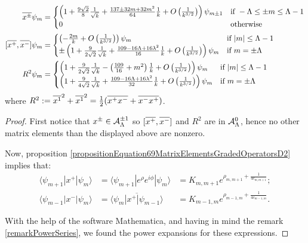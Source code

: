 \begin{proposition}
\begin{align}
    \cut{x^\pm}  \psi_m
        &= \begin{cases}
        \left(1 + \frac{9 \sqrt{2}}{8} \frac{1}{\sqrt{k}} + \frac{137 \pm 32m + 32m^2}{64} \frac{1}{k} + O\left(\frac{1}{k^{3/2}}\right) \right) \psi_{m \pm 1} & \text{if } -\Lambda \leq \pm m \leq \Lambda -1
        \\
        0 & \text{otherwise}
        \end{cases}\\
    [\cut{x^+}, \cut{x^-}]  \psi_m
        &= \begin{cases}
        \left( -\frac{2m}{k}  + O\left(\frac{1}{k^{3/2}}\right) \right) \psi_{m} & \text{if } |m| \leq \Lambda -1
        \\
        \pm \left( 1 + \frac{9}{2\sqrt{2}} \frac{1}{\sqrt{k}} +  \frac{109-16\Lambda + 16\lambda^2}{16} \frac{1}{k} + O\left(\frac{1}{k^{3/2}}\right) \right) \psi_{m} & \text{if } m = \pm \Lambda 
        \end{cases}\\
    R^2  \psi_m
        &= \begin{cases}
        \left( 1+ \frac{9}{2\sqrt{2}} \frac{1}{\sqrt{k}} -\left(\frac{109}{16}+m^2\right) \frac{1}{k}  + O\left(\frac{1}{k^{3/2}}\right) \right) \psi_{m} & \text{if } |m| \leq \Lambda -1
        \\
        \left( 1+ \frac{9}{4\sqrt{2}} \frac{1}{\sqrt{k}} + \frac{109-16\Lambda+16\lambda^2}{32} \frac{1}{k} + O\left(\frac{1}{k^{3/2}}\right) \right) \psi_{m} & \text{if } m = \pm \Lambda 
        \end{cases}
\end{align}
where $R^2 := \overline{x^1}^2 + \overline{x^1}^2 = \frac{1}{2}(\overline{x^+}\overline{x^-} + \overline{x^-}\overline{x^+})$.
\end{proposition}
\begin{proof}
First notice that $x^\pm \in \mathcal A^{\pm 1}_\Lambda$ so $[\overline{x^+}, \overline{x^-}]$ and $R^2$ are in $\mathcal A^0_\Lambda$, hence no other matrix elements than the displayed above are nonzero. 

Now, proposition \ref{propositionEquation69MatrixElementsGradedOperatorsD2} implies that:
\begin{align*}
    \langle \psi_{m+1} | x^+ | \psi_m \rangle 
        &= %
        \langle \psi_{m+1} | e^\rho e^{i\phi} | \psi_m \rangle
        &= %
        K_{m,m+1} e^{\rho_{m,m+1} + \frac{1}{4 c_{m,m+1}}};\\
    \langle \psi_{m-1} | x^- | \psi_m \rangle 
        &= \overline{\langle \psi_{m} | x^+ | \psi_{m-1} \rangle}
        &= K_{m-1,m} e^{\rho_{m-1,m} + \frac{1}{4 c_{m-1,m}}}.
\end{align*}

With the help of the software Mathematica, and having in mind the remark \ref{remarkPowerSeries}, we found the power expansions for these expressions.
\end{proof}

